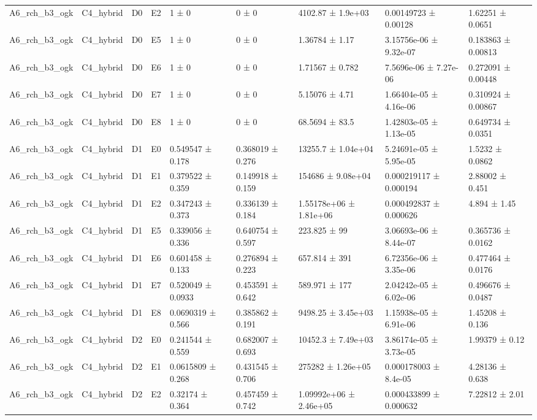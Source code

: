 \begin{table}
\begin{tabular}{lllllllll}
A6\_rch\_b3\_ogk & C4\_hybrid & D0 & E2 & 1 ± 0 & 0 ± 0 & 4102.87 ± 1.9e+03 & 0.00149723 ± 0.00128 & 1.62251 ± 0.0651 \\
A6\_rch\_b3\_ogk & C4\_hybrid & D0 & E5 & 1 ± 0 & 0 ± 0 & 1.36784 ± 1.17 & 3.15756e-06 ± 9.32e-07 & 0.183863 ± 0.00813 \\
A6\_rch\_b3\_ogk & C4\_hybrid & D0 & E6 & 1 ± 0 & 0 ± 0 & 1.71567 ± 0.782 & 7.5696e-06 ± 7.27e-06 & 0.272091 ± 0.00448 \\
A6\_rch\_b3\_ogk & C4\_hybrid & D0 & E7 & 1 ± 0 & 0 ± 0 & 5.15076 ± 4.71 & 1.66404e-05 ± 4.16e-06 & 0.310924 ± 0.00867 \\
A6\_rch\_b3\_ogk & C4\_hybrid & D0 & E8 & 1 ± 0 & 0 ± 0 & 68.5694 ± 83.5 & 1.42803e-05 ± 1.13e-05 & 0.649734 ± 0.0351 \\
A6\_rch\_b3\_ogk & C4\_hybrid & D1 & E0 & 0.549547 ± 0.178 & 0.368019 ± 0.276 & 13255.7 ± 1.04e+04 & 5.24691e-05 ± 5.95e-05 & 1.5232 ± 0.0862 \\
A6\_rch\_b3\_ogk & C4\_hybrid & D1 & E1 & 0.379522 ± 0.359 & 0.149918 ± 0.159 & 154686 ± 9.08e+04 & 0.000219117 ± 0.000194 & 2.88002 ± 0.451 \\
A6\_rch\_b3\_ogk & C4\_hybrid & D1 & E2 & 0.347243 ± 0.373 & 0.336139 ± 0.184 & 1.55178e+06 ± 1.81e+06 & 0.000492837 ± 0.000626 & 4.894 ± 1.45 \\
A6\_rch\_b3\_ogk & C4\_hybrid & D1 & E5 & 0.339056 ± 0.336 & 0.640754 ± 0.597 & 223.825 ± 99 & 3.06693e-06 ± 8.44e-07 & 0.365736 ± 0.0162 \\
A6\_rch\_b3\_ogk & C4\_hybrid & D1 & E6 & 0.601458 ± 0.133 & 0.276894 ± 0.223 & 657.814 ± 391 & 6.72356e-06 ± 3.35e-06 & 0.477464 ± 0.0176 \\
A6\_rch\_b3\_ogk & C4\_hybrid & D1 & E7 & 0.520049 ± 0.0933 & 0.453591 ± 0.642 & 589.971 ± 177 & 2.04242e-05 ± 6.02e-06 & 0.496676 ± 0.0487 \\
A6\_rch\_b3\_ogk & C4\_hybrid & D1 & E8 & 0.0690319 ± 0.566 & 0.385862 ± 0.191 & 9498.25 ± 3.45e+03 & 1.15938e-05 ± 6.91e-06 & 1.45208 ± 0.136 \\
A6\_rch\_b3\_ogk & C4\_hybrid & D2 & E0 & 0.241544 ± 0.559 & 0.682007 ± 0.693 & 10452.3 ± 7.49e+03 & 3.86174e-05 ± 3.73e-05 & 1.99379 ± 0.12 \\
A6\_rch\_b3\_ogk & C4\_hybrid & D2 & E1 & 0.0615809 ± 0.268 & 0.431545 ± 0.706 & 275282 ± 1.26e+05 & 0.000178003 ± 8.4e-05 & 4.28136 ± 0.638 \\
A6\_rch\_b3\_ogk & C4\_hybrid & D2 & E2 & 0.32174 ± 0.364 & 0.457459 ± 0.742 & 1.09992e+06 ± 2.46e+05 & 0.000433899 ± 0.000632 & 7.22812 ± 2.01 \\

\end{tabular}
\end{table}
